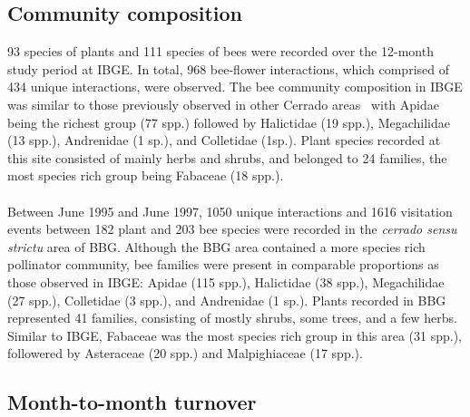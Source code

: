 \documentclass[11pt]{article}
\begin{document}
\subsection{Community composition}
93 species of plants and 111 species of bees were recorded over the 12-month study period at IBGE. In total, 968 bee-flower interactions, which comprised of 434 unique interactions, were observed. The bee community composition in IBGE was similar to those previously observed in other Cerrado areas~\citep{Silveira1995, Pinheiro-Machado2002} with Apidae being the richest group (77 spp.) followed by Halictidae (19 spp.), Megachilidae (13 spp.), Andrenidae (1 sp.), and Colletidae (1sp.). Plant species recorded at this site consisted of mainly herbs and shrubs, and belonged to 24 families, the most species rich group being Fabaceae (18 spp.). \\
\\
Between June 1995 and June 1997, 1050 unique interactions and 1616 visitation events between 182 plant and 203 bee species were recorded in the \textit{cerrado sensu strictu} area of BBG. Although the BBG area contained a more species rich pollinator community, bee families were present in comparable proportions as those observed in IBGE: Apidae (115 spp.), Halictidae (38 spp.), Megachilidae (27 spp.), Colletidae (3 spp.), and Andrenidae (1 sp.). Plants recorded in BBG represented 41 families, consisting of mostly shrubs, some trees, and a few herbs. Similar to IBGE, Fabaceae was the most species rich group in this area (31 spp.), followered by Asteraceae (20 spp.) and Malpighiaceae (17 spp.). 

\subsection{Month-to-month turnover}
\end{document}
